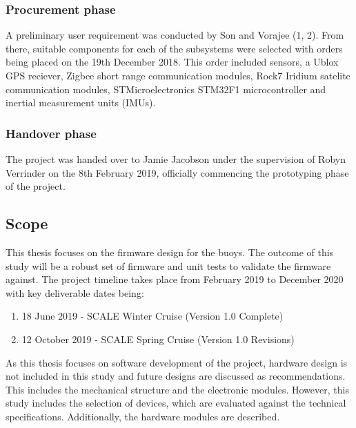 \subsubsection{Procurement phase}

A preliminary user requirement was conducted by Son and Vorajee (1, 2). From there, suitable components for each of the subsystems were selected with orders being placed on the 19th December 2018. This order included sensors, a Ublox GPS reciever, Zigbee short range communication modules, Rock7 Iridium satelite communication modules, STMicroelectronics STM32F1 microcontroller and inertial measurement units (IMUs).

\subsubsection{Handover phase}

The project was handed over to Jamie Jacobson under the supervision of Robyn Verrinder on the 8th February 2019, officially commencing the prototyping phase of the project.

\subsection{Scope}

This thesis focuses on the firmware design for the buoys. The outcome of this study will be a robust set of firmware and unit tests to validate the firmware against. The project timeline takes place from February 2019 to December 2020 with key deliverable dates being:

\begin{enumerate}
    \item 18 June 2019 - SCALE Winter Cruise  (Version 1.0 Complete)
    \item 12 October 2019 - SCALE Spring Cruise (Version 1.0 Revisions)
\end{enumerate}


As this thesis focuses on software development of the project, hardware design is not included in this study and future designs are discussed as recommendations. This includes the mechanical structure and the electronic modules. However, this study includes the selection of devices, which are evaluated against the technical specifications. Additionally, the hardware modules are described.\par 

